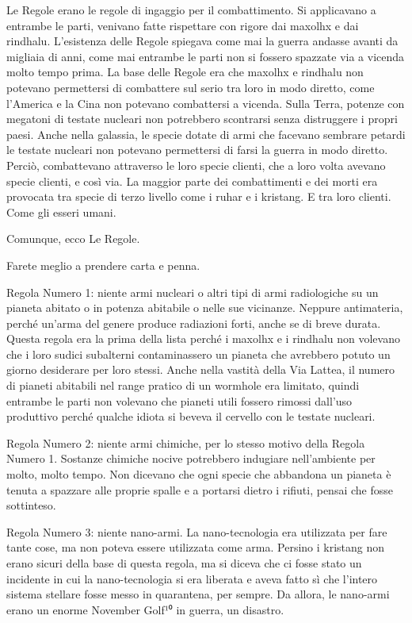Le Regole erano le regole di ingaggio per il combattimento. Si
applicavano a entrambe le parti, venivano fatte rispettare con rigore
dai maxolhx e dai rindhalu. L'esistenza delle Regole spiegava come mai
la guerra andasse avanti da migliaia di anni, come mai entrambe le parti
non si fossero spazzate via a vicenda molto tempo prima. La base delle
Regole era che maxolhx e rindhalu non potevano permettersi di combattere
sul serio tra loro in modo diretto, come l'America e la Cina non
potevano combattersi a vicenda. Sulla Terra, potenze con megatoni di
testate nucleari non potrebbero scontrarsi senza distruggere i propri
paesi. Anche nella galassia, le specie dotate di armi che facevano
sembrare petardi le testate nucleari non potevano permettersi di farsi
la guerra in modo diretto. Perciò, combattevano attraverso le loro
specie clienti, che a loro volta avevano specie clienti, e così via. La
maggior parte dei combattimenti e dei morti era provocata tra specie di
terzo livello come i ruhar e i kristang. E tra loro clienti. Come gli
esseri umani.

Comunque, ecco Le Regole.

Farete meglio a prendere carta e penna.

Regola Numero 1: niente armi nucleari o altri tipi di armi radiologiche
su un pianeta abitato o in potenza abitabile o nelle sue vicinanze.
Neppure antimateria, perché un'arma del genere produce radiazioni forti,
anche se di breve durata. Questa regola era la prima della lista perché
i maxolhx e i rindhalu non volevano che i loro sudici subalterni
contaminassero un pianeta che avrebbero potuto un giorno desiderare per
loro stessi. Anche nella vastità della Via Lattea, il numero di pianeti
abitabili nel range pratico di un wormhole era limitato, quindi entrambe
le parti non volevano che pianeti utili fossero rimossi dall'uso
produttivo perché qualche idiota si beveva il cervello con le testate
nucleari.

Regola Numero 2: niente armi chimiche, per lo stesso motivo della Regola
Numero 1. Sostanze chimiche nocive potrebbero indugiare nell'ambiente
per molto, molto tempo. Non dicevano che ogni specie che abbandona un
pianeta è tenuta a spazzare alle proprie spalle e a portarsi dietro i
rifiuti, pensai che fosse sottinteso.

Regola Numero 3: niente nano-armi. La nano-tecnologia era utilizzata per
fare tante cose, ma non poteva essere utilizzata come arma. Persino i
kristang non erano sicuri della base di questa regola, ma si diceva che
ci fosse stato un incidente in cui la nano-tecnologia si era liberata e
aveva fatto sì che l'intero sistema stellare fosse messo in quarantena,
per sempre. Da allora, le nano-armi erano un enorme November Golf¹⁰ in
guerra, un disastro.

